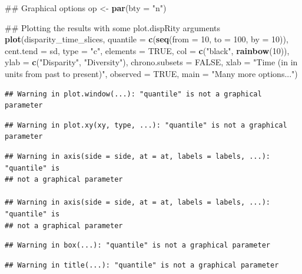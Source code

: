 \documentclass[]{book}
\newenvironment{Shaded}{\begin{snugshade}}{\end{snugshade}}
\newcommand{\KeywordTok}[1]{\textcolor[rgb]{0.13,0.29,0.53}{\textbf{#1}}}
\newcommand{\DataTypeTok}[1]{\textcolor[rgb]{0.13,0.29,0.53}{#1}}
\newcommand{\DecValTok}[1]{\textcolor[rgb]{0.00,0.00,0.81}{#1}}
\newcommand{\StringTok}[1]{\textcolor[rgb]{0.31,0.60,0.02}{#1}}
\newcommand{\OtherTok}[1]{\textcolor[rgb]{0.56,0.35,0.01}{#1}}
\newcommand{\NormalTok}[1]{#1}
\theoremstyle{definition}
\theoremstyle{definition}
\theoremstyle{definition}
\theoremstyle{remark}
\begin{document}
\begin{Shaded}
\begin{Highlighting}[]
\NormalTok{## Graphical options}
\NormalTok{op <-}\StringTok{ }\KeywordTok{par}\NormalTok{(}\DataTypeTok{bty =} \StringTok{"n"}\NormalTok{)}

\NormalTok{## Plotting the results with some plot.dispRity arguments}
\KeywordTok{plot}\NormalTok{(disparity_time_slices, }\DataTypeTok{quantile =} \KeywordTok{c}\NormalTok{(}\KeywordTok{seq}\NormalTok{(}\DataTypeTok{from =} \DecValTok{10}\NormalTok{, }\DataTypeTok{to =} \DecValTok{100}\NormalTok{, }\DataTypeTok{by =} \DecValTok{10}\NormalTok{)),}
    \DataTypeTok{cent.tend =}\NormalTok{ sd, }\DataTypeTok{type =} \StringTok{"c"}\NormalTok{, }\DataTypeTok{elements =} \OtherTok{TRUE}\NormalTok{, }\DataTypeTok{col =} \KeywordTok{c}\NormalTok{(}\StringTok{"black"}\NormalTok{, }\KeywordTok{rainbow}\NormalTok{(}\DecValTok{10}\NormalTok{)),}
    \DataTypeTok{ylab =} \KeywordTok{c}\NormalTok{(}\StringTok{"Disparity"}\NormalTok{, }\StringTok{"Diversity"}\NormalTok{), }\DataTypeTok{chrono.subsets =} \OtherTok{FALSE}\NormalTok{,}
    \DataTypeTok{xlab =} \StringTok{"Time (in in units from past to present)"}\NormalTok{, }\DataTypeTok{observed =} \OtherTok{TRUE}\NormalTok{,}
    \DataTypeTok{main =} \StringTok{"Many more options..."}\NormalTok{)}
\end{Highlighting}
\end{Shaded}

\begin{verbatim}
## Warning in plot.window(...): "quantile" is not a graphical parameter
\end{verbatim}

\begin{verbatim}
## Warning in plot.xy(xy, type, ...): "quantile" is not a graphical parameter
\end{verbatim}

\begin{verbatim}
## Warning in axis(side = side, at = at, labels = labels, ...): "quantile" is
## not a graphical parameter

## Warning in axis(side = side, at = at, labels = labels, ...): "quantile" is
## not a graphical parameter
\end{verbatim}

\begin{verbatim}
## Warning in box(...): "quantile" is not a graphical parameter
\end{verbatim}

\begin{verbatim}
## Warning in title(...): "quantile" is not a graphical parameter
\end{verbatim}
\end{document}
